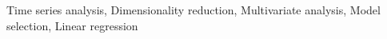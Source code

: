 \documentclass[]{article}
\begin{document}
Time series analysis, Dimensionality reduction, Multivariate analysis, Model selection, Linear regression
\end{document}
